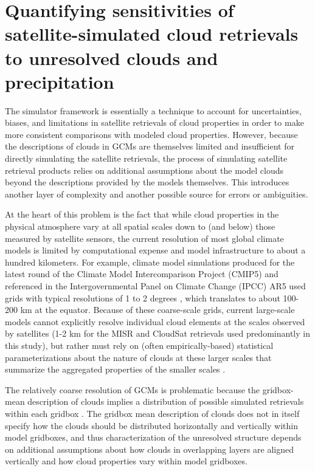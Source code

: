 \chapter{Quantifying sensitivities of satellite-simulated cloud
retrievals to unresolved clouds and precipitation}\label{sec:subgrid1}

The simulator framework is essentially a technique to account for
uncertainties, biases, and limitations in satellite retrievals of cloud
properties in order to make more consistent comparisons with modeled
cloud properties. However, because the descriptions of clouds in GCMs
are themselves limited and insufficient for directly simulating the
satellite retrievals, the process of simulating satellite retrieval
products relies on additional assumptions about the model clouds beyond
the descriptions provided by the models themselves. This introduces
another layer of complexity and another possible source for errors or
ambiguities.

At the heart of this problem is the fact that while cloud properties in
the physical atmosphere vary at all spatial scales down to (and below)
those measured by satellite sensors, the current resolution of most
global climate models is limited by computational expense and model
infrastructure to about a hundred kilometers. For example, climate model
simulations produced for the latest round of the Climate Model
Intercomparison Project (CMIP5) and referenced in the Intergovernmental
Panel on Climate Change (IPCC) AR5 used grids with typical resolutions
of 1 to 2 degrees \citep{flato_et_al_2013}, which translates to about
100-200 km at the equator. Because of these coarse-scale grids, current
large-scale models cannot explicitly resolve individual cloud elements
at the scales observed by satellites (1-2 km for the MISR and CloudSat
retrievals used predominantly in this study), but rather must rely on
(often empirically-based) statistical parameterizations about the nature
of clouds at these larger scales that summarize the aggregated
properties of the smaller scales \citep{randall_et_al_2003}.

The relatively coarse resolution of GCMs is problematic because the
gridbox-mean description of clouds implies a distribution of possible
simulated retrievals within each gridbox \citep{pincus_et_al_2012}. The
gridbox mean description of clouds does not in itself specify how the
clouds should be distributed horizontally and vertically within model
gridboxes, and thus characterization of the unresolved structure depends
on additional assumptions about how clouds in overlapping layers are
aligned vertically and how cloud properties vary within model gridboxes.

